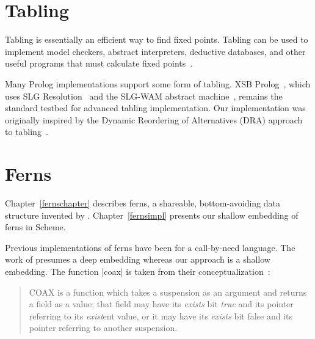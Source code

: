 \section{Tabling}\label{tablingrelated}

Tabling is essentially an efficient way to find fixed points.  Tabling
can be used to implement model checkers, abstract interpreters,
deductive databases, and other useful programs that must calculate
fixed points~\cite{dra09,memoingforlp}.

Many Prolog implementations support some form of tabling.  XSB
Prolog~\cite{xsb}, which uses SLG Resolution~\cite{SLGresolution} and
the SLG-WAM abstract machine~\cite{SLGwam}, remains the standard
testbed for advanced tabling implementation.  Our implementation was
originally inspired by the Dynamic Reordering of Alternatives (DRA)
approach to
tabling~\cite{dra09,simpleimplementingtabling}.








\section{Ferns}\label{fernsrelated}

Chapter~\ref{fernschapter} describes ferns, a shareable,
bottom-avoiding data structure invented by \citet{ferns81}.
Chapter~\ref{fernsimpl} presents our shallow embedding of ferns in
Scheme.

Previous implementations of ferns have been for a call-by-need
language.  The work of \citet{Friedman79b,DFried80,ferns81} presumes a
deep embedding whereas our approach is a shallow embedding.  The
function \scheme|coax| is taken from their conceptualization~\cite{Friedman79b}:

\begin{quote}
  {COAX is a function which takes a suspension as an argument and
    returns a field as a value; that field may have its \emph{exists}
    bit \emph{true} and its pointer referring to its \emph{exist}ent
    value, or it may have its \emph{exists} bit false and its pointer
    referring to another suspension.}
\end{quote}

